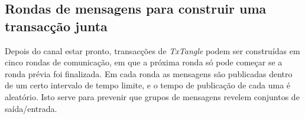\subsection{Rondas de mensagens para construir uma transacção junta}
\label{subsec:message-rounds-txtangle}

Depois do canal estar pronto, transacções de {\em TxTangle} podem ser construídas em cinco rondas de comunicação, em que a próxima ronda só pode começar se a ronda prévia foi finalizada. Em cada ronda as mensagens são publicadas dentro de um certo intervalo de tempo limite, e o tempo de publicação de cada uma é aleatório. Isto serve para prevenir que grupos de mensagens revelem conjuntos de saída/entrada. 

